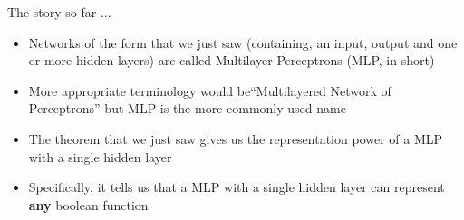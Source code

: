 \documentclass[serif, aspectratio=169]{beamer}
\begin{document}
\begin{frame}
\begin{block}{The story so far ...}
\begin{itemize}\justifying
\item<1-> Networks of the form that we just saw (containing, an input, output and one or more hidden layers) are called Multilayer Perceptrons (MLP, in short)
\item<2-> More appropriate terminology would be``Multilayered Network of Perceptrons'' but MLP is the more commonly used name
\item<3-> The theorem that we just saw gives us the representation power of a MLP with a single hidden layer
\item<4-> Specifically, it tells us that a MLP with a single hidden layer can represent \textbf{any} boolean function
\end{itemize}
\end{block}
\end{frame}
\end{document}
